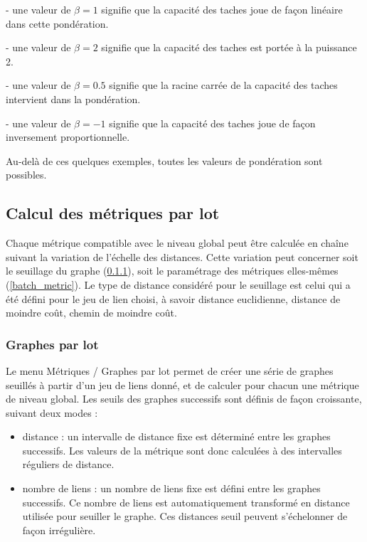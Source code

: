 \documentclass{article}
\begin{document}
{}- une valeur de  $\beta =1$ signifie que la capacité des taches joue de façon linéaire dans cette pondération.

{}- une valeur de  $\beta =2$ signifie que la capacité des taches est portée à la puissance 2.

{}- une valeur de  $\beta =0.5$ signifie que la racine carrée de la capacité des taches intervient dans la pondération.

{}- une valeur de $\beta =-1$ signifie que la capacité des taches joue de façon inversement proportionnelle.

Au-delà de ces quelques exemples, toutes les valeurs de pondération sont possibles.

\subsection{Calcul des métriques par lot}

Chaque métrique compatible avec le niveau global peut être calculée en chaîne suivant la variation de l’échelle des distances. Cette variation peut concerner soit le seuillage du graphe (\ref{batch_graph}), soit le paramétrage des métriques elles-mêmes (\ref{batch_metric}). Le type de distance considéré pour le seuillage est celui qui a été défini pour le jeu de lien choisi, à savoir distance euclidienne, distance de moindre coût, chemin de moindre coût. 

\subsubsection{Graphes par lot}
\label{batch_graph}
Le menu Métriques / Graphes par lot permet de créer une série de graphes seuillés à partir d’un jeu de liens donné, et de calculer pour chacun une métrique de niveau global. Les seuils des graphes successifs sont définis de façon croissante, suivant deux modes :
\begin{itemize}
	\item distance : un intervalle de distance fixe est déterminé entre les graphes successifs. Les valeurs de la métrique sont donc calculées à des intervalles réguliers de distance.
	\item nombre de liens : un nombre de liens fixe est défini entre les graphes successifs. Ce nombre de liens est automatiquement transformé en distance utilisée pour seuiller le graphe. Ces distances seuil peuvent s’échelonner de façon irrégulière. 
\end{itemize}
\end{document}
